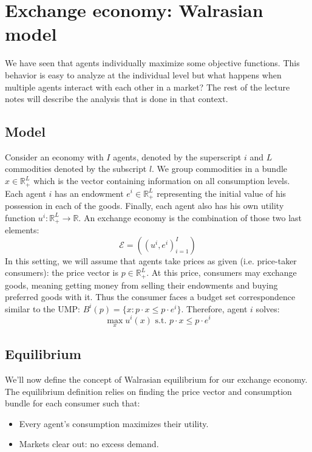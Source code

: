 \documentclass[12pt]{report}
\begin{document}
\section{Exchange economy: Walrasian model}

We have seen that agents individually maximize some objective functions. This behavior is easy to analyze at the individual level but what happens when multiple agents interact with each other in a market? The rest of the lecture notes will describe the analysis that is done in that context.

\subsection{Model}

Consider an economy with $I$ agents, denoted by the superscript $i$ and $L$ commodities denoted by the subscript $l$. We group commodities in a bundle $x\in \mathbb{R}_+
^L$ which is the vector containing information on all consumption levels. Each agent $i$ has an endowment $e^i\in\mathbb{R}_+^L$ representing the initial value of his possession in each of the goods. Finally, each agent also has his own utility function $u^i:\mathbb{R}_+^L\to\mathbb{R}$. An exchange economy is the combination of those two last elements: $$\mathcal{E} = ((u^i, e^i)_{i=1}^{I}) $$ In this setting, we will assume that agents take prices as given (i.e. price-taker consumers): the price vector is $p\in\mathbb{R}_+^L$. At this price, consumers may exchange goods, meaning getting money from selling their endowments and buying preferred goods with it. Thus the consumer faces a budget set correspondence similar to the UMP: $B^i(p) = \{x: p\cdot x \leq p\cdot e^i\}$. Therefore, agent $i$ solves: $$\max_{x} u^i(x) \text{ s.t. } p\cdot x\leq p\cdot e^i $$

\subsection{Equilibrium}

We'll now define the concept of Walrasian equilibrium for our exchange economy. The equilibrium definition relies on finding the price vector and consumption bundle for each consumer such that:\begin{itemize}
\item Every agent's consumption maximizes their utility.
\item Markets clear out: no excess demand.
\end{itemize}
\end{document}
